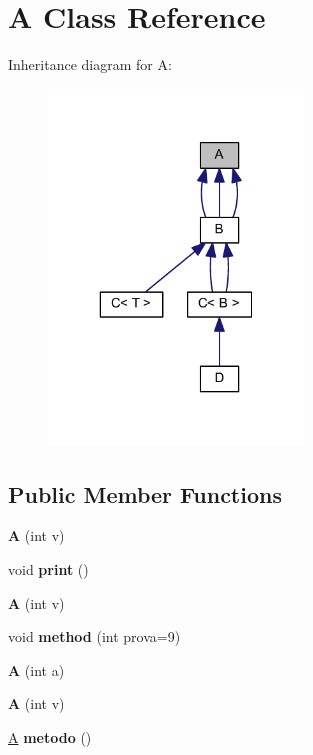 \hypertarget{class_a}{
\section{A Class Reference}
\label{class_a}
}


Inheritance diagram for A:\nopagebreak
\begin{figure}[H]
\begin{center}
\leavevmode
\includegraphics[width=193pt]{class_a__inherit__graph}
\end{center}
\end{figure}
\subsection*{Public Member Functions}
\begin{DoxyCompactItemize}
\item 
\hypertarget{class_a_a685ef375642d9bf4d5fe98f0809cdc41}{
{\bfseries A} (int v)}
\label{class_a_a685ef375642d9bf4d5fe98f0809cdc41}

\item 
\hypertarget{class_a_ab28ba29c1a326b5d34592a0d99f4a7b0}{
void {\bfseries print} ()}
\label{class_a_ab28ba29c1a326b5d34592a0d99f4a7b0}

\item 
\hypertarget{class_a_a685ef375642d9bf4d5fe98f0809cdc41}{
{\bfseries A} (int v)}
\label{class_a_a685ef375642d9bf4d5fe98f0809cdc41}

\item 
\hypertarget{class_a_af4fad7671624ac55169bf67d4c7bba12}{
void {\bfseries method} (int prova=9)}
\label{class_a_af4fad7671624ac55169bf67d4c7bba12}

\item 
\hypertarget{class_a_ac970e0fdad67e6b48c3e6c7fad9b1e50}{
{\bfseries A} (int a)}
\label{class_a_ac970e0fdad67e6b48c3e6c7fad9b1e50}

\item 
\hypertarget{class_a_a685ef375642d9bf4d5fe98f0809cdc41}{
{\bfseries A} (int v)}
\label{class_a_a685ef375642d9bf4d5fe98f0809cdc41}

\item 
\hypertarget{class_a_aa9c2bd768eb3cc248c18379468e6ae2f}{
\hyperlink{class_a}{A} {\bfseries metodo} ()}
\label{class_a_aa9c2bd768eb3cc248c18379468e6ae2f}

\end{DoxyCompactItemize}

